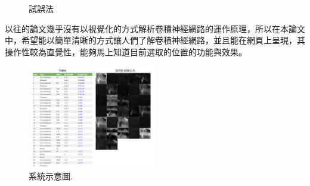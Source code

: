 \begin{figure}[H]
\centering  
{}
\caption{試誤法}
\label{Fig.main}
\end{figure}
以往的論文幾乎沒有以視覺化的方式解析卷積神經網路的運作原理，所以在本論文中，希望能以簡單清晰的方式讓人們了解卷積神經網路，並且能在網頁上呈現，其操作性較為直覺性，能夠馬上知道目前選取的位置的功能與效果。
\begin{figure}[htpb!]
  \centering
    \includegraphics[width=0.5\textwidth]{fig/system1.png}
    \caption{\label{fig:系統1}系統示意圖.}
\end{figure}

